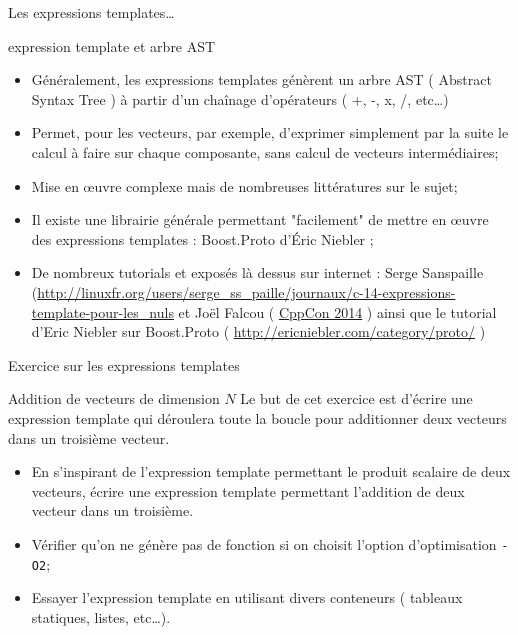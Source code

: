 \documentclass[handout,10pt]{beamer}
\begin{document}
\begin{frame}[fragile]{Les expressions templates\ldots}
\tiny
\begin{block}{expression template et arbre AST}
\begin{itemize}
\item Généralement, les expressions templates génèrent un arbre AST ( Abstract Syntax Tree ) à partir d'un chaînage d'opérateurs ( +, -, x, /, etc\ldots )
\item Permet, pour les vecteurs, par exemple, d'exprimer simplement par la suite le calcul à faire sur chaque composante, sans calcul de vecteurs intermédiaires;
\item Mise en {\oe}uvre complexe mais de nombreuses littératures sur le sujet;
\item Il existe une librairie générale permettant "facilement" de mettre en {\oe}uvre des expressions templates : Boost.Proto d'\'Eric Niebler ;
\item De nombreux tutorials et exposés là dessus sur internet : Serge Sanspaille (\url{http://linuxfr.org/users/serge_ss_paille/journaux/c-14-expressions-template-pour-les_nuls} et Joël Falcou ( \href{https://www.google.fr/url?sa=t&source=web&rct=j&url=https://www.youtube.com/watch%3Fv%3DIiVl5oSU5B8&ved=0ahUKEwiDlZeHlffWAhXEORoKHaRvAiMQwqsBCCEwAA&usg=AOvVaw1SAydGHQAXoJVZ-RdvW1TT}{CppCon 2014} ) ainsi que le tutorial d'Eric Niebler sur Boost.Proto ( \url{http://ericniebler.com/category/proto/} )
\end{itemize}
\end{block}
\end{frame}

\begin{frame}[fragile]{Exercice sur les expressions templates}
\tiny

\begin{exampleblock}{Addition de vecteurs de dimension $N$}
Le but de cet exercice est d'écrire une expression template qui déroulera toute la boucle pour additionner deux vecteurs
dans un troisième vecteur.
\begin{itemize}
\item En s'inspirant de l'expression template permettant le produit scalaire de deux vecteurs, écrire une expression template permettant
l'addition de deux vecteur dans un troisième.
\item Vérifier qu'on ne génère pas de fonction si on choisit l'option d'optimisation \texttt{-O2};
\item Essayer l'expression template en utilisant divers conteneurs ( tableaux statiques, listes, etc\ldots ).
\end{itemize}
\end{exampleblock}

\end{frame}
\end{document}
